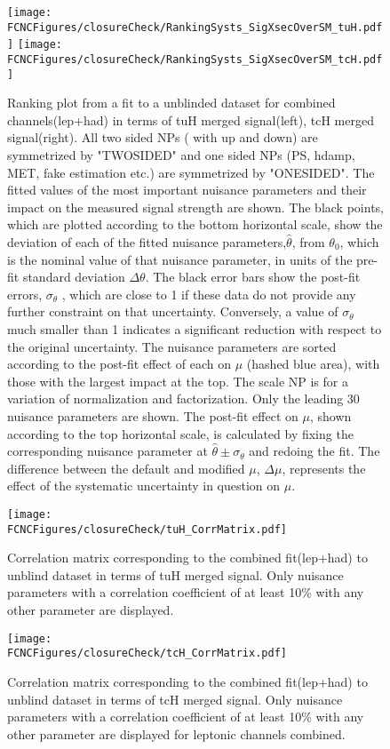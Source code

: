 \begin{figure}[H]
\centering
\texttt{[image: \\FCNCFigures/closureCheck/RankingSysts\_SigXsecOverSM\_tuH.pdf]}
\texttt{[image: \\FCNCFigures/closureCheck/RankingSysts\_SigXsecOverSM\_tcH.pdf]}
\caption{ Ranking plot from a fit to a unblinded dataset for combined channels(lep+had) in terms of tuH merged signal(left), tcH merged signal(right). All two sided NPs ( with up and down) are symmetrized by "TWOSIDED" and one sided NPs (PS, hdamp, MET, fake estimation etc.) are symmetrized by "ONESIDED". The fitted values of the most important nuisance parameters and their impact on the measured signal strength are shown. The black points, which are plotted according to the bottom horizontal scale, show the deviation of each of the fitted nuisance parameters,$\hat{\theta}$, from $\theta_{0}$, which is the nominal value of that nuisance parameter, in units of the
pre-fit standard deviation $\Delta\theta$. The black error bars show the post-fit errors, $\sigma_{\theta}$ , which are close to 1 if these data do not
provide any further constraint on that uncertainty. Conversely, a value of $\sigma_{\theta}$ much smaller than 1 indicates a significant
reduction with respect to the original uncertainty. The nuisance parameters are sorted according to the post-fit effect of each on $\mu$ (hashed blue area),
with those with the largest impact at the top. The scale NP is for a variation of normalization and factorization. Only the leading 30 nuisance parameters are shown. The post-fit effect on $\mu$,
shown according to the top horizontal scale, is calculated by fixing the corresponding nuisance parameter at $\hat{\theta}\pm \sigma_{\theta}$ and
redoing the fit. The difference between the default and modified $\mu$, $\Delta\mu$, represents the effect of the systematic uncertainty
in question on $\mu$.}
\label{fig:rank_lep_had}
\end{figure}


\begin{figure}[htb]
\centering
\texttt{[image: \\FCNCFigures/closureCheck/tuH\_CorrMatrix.pdf]}
\caption{ Correlation matrix corresponding to the combined fit(lep+had) to unblind dataset in terms of tuH merged signal. Only nuisance parameters with a correlation coefficient of at least 10\% with any other parameter are displayed.}
\label{fig:com_corr_tuH}
\end{figure}


\begin{figure}[htb]
\centering
\texttt{[image: \\FCNCFigures/closureCheck/tcH\_CorrMatrix.pdf]}
\caption{ Correlation matrix corresponding to the combined fit(lep+had) to unblind dataset in terms of tcH merged signal. Only nuisance parameters with a correlation coefficient of at least 10\% with any other parameter are displayed for leptonic channels combined.}
\label{fig:com_corr_tcH}
\end{figure}






